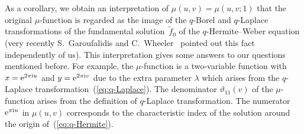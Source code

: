 \documentclass[pdftex]{sigma}
\numberwithin{equation}{section}
\theoremstyle{definition}
\begin{document}
As a corollary, we obtain an interpretation of $\mu(u,v)=\mu(u,v;1)$ that the original $\mu$-function is regarded as the image of the $q$-Borel and $q$-Laplace transformations of the fundamental solution~$\widetilde{f}_{0}$ of the $q$-Hermite--Weber equation
(very recently S.~Garoufalidis and C.~Wheeler~\cite{GW} pointed out this fact independently of us).
This interpretation gives some answers to our questions mentioned before.
For example, the $\mu$-function is a two-variable function with $x={\rm e}^{2\pi{\rm i} u}$ and $y={\rm e}^{2\pi{\rm i} v}$ due to the extra parameter $\lambda $ which arises from the $q$-Laplace transformation~(\ref{eq:q-Laplace}).
The denominator $\vartheta_{11}(v)$ of the $\mu$-function arises from the definition of $q$-Laplace transformation.
The numerator ${\rm e}^{\pi{\rm i} u}$ in $\mu(u,v)$ corresponds to the characteristic index of the solution around the origin of~(\ref{eq:q-Hermite}).
\end{document}
